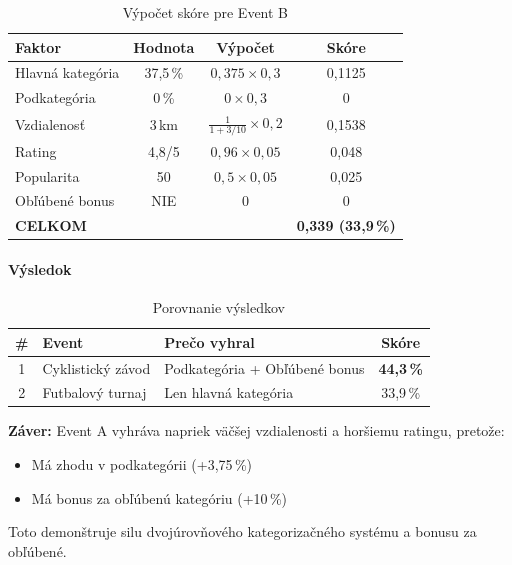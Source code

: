 \begin{table}[H]
\centering
\begin{tabular}{|l|c|c|c|}
\hline
\textbf{Faktor} & \textbf{Hodnota} & \textbf{Výpočet} & \textbf{Skóre} \\
\hline
Hlavná kategória & 37,5\,\% & $0{,}375 \times 0{,}3$ & 0,1125 \\
\hline
Podkategória & 0\,\% & $0 \times 0{,}3$ & 0 \\
\hline
Vzdialenosť & 3\,km & $\frac{1}{1+3/10} \times 0{,}2$ & 0,1538 \\
\hline
Rating & 4,8/5 & $0{,}96 \times 0{,}05$ & 0,048 \\
\hline
Popularita & 50 & $0{,}5 \times 0{,}05$ & 0,025 \\
\hline
Obľúbené bonus & NIE & $0$ & 0 \\
\hline
\textbf{CELKOM} & & & \textbf{0,339 (33,9\,\%)} \\
\hline
\end{tabular}
\caption{Výpočet skóre pre Event B}
\end{table}

\paragraph{Výsledok}

\begin{table}[H]
\centering
\begin{tabular}{|c|l|l|c|}
\hline
\textbf{\#} & \textbf{Event} & \textbf{Prečo vyhral} & \textbf{Skóre} \\
\hline
1 & Cyklistický závod & Podkategória + Obľúbené bonus & \textbf{44,3\,\%} \\
\hline
2 & Futbalový turnaj & Len hlavná kategória & 33,9\,\% \\
\hline
\end{tabular}
\caption{Porovnanie výsledkov}
\end{table}

\textbf{Záver:} Event A vyhráva napriek väčšej vzdialenosti a horšiemu ratingu, pretože:
\begin{itemize}
    \item Má zhodu v podkategórii (+3,75\,\%)
    \item Má bonus za obľúbenú kategóriu (+10\,\%)
\end{itemize}

Toto demonštruje silu dvojúrovňového kategorizačného systému a bonusu za obľúbené.

